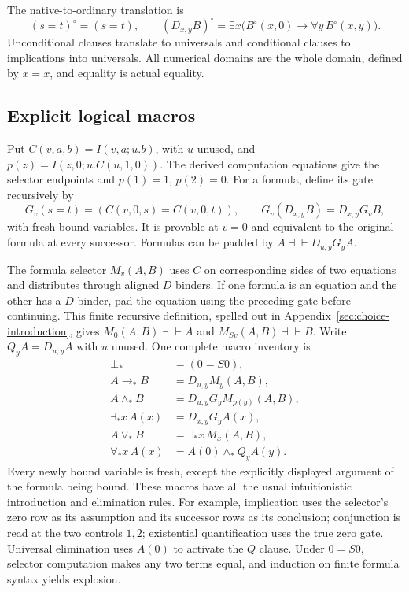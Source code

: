 The native-to-ordinary translation is
\[
 (s=t)^\circ=(s=t),\qquad
 (D_{x,y}B)^\circ=\exists x\bigl(B^\circ(x,0)\to\forall y\,B^\circ(x,y)\bigr).
\]
Unconditional clauses translate to universals and conditional clauses to
implications into universals. All numerical domains are the whole domain,
defined by $x=x$, and equality is actual equality.

\subsection{Explicit logical macros}

Put $C(v,a,b)=I(v,a;u.b)$, with $u$ unused, and
$p(z)=I(z,0;u.C(u,1,0))$. The derived computation equations give the
selector endpoints and $p(1)=1$, $p(2)=0$.
For a formula, define its gate recursively by
\[
 G_v(s=t)=(C(v,0,s)=C(v,0,t)),\qquad
 G_v(D_{x,y}B)=D_{x,y}G_vB,
\]
with fresh bound variables. It is provable at $v=0$ and equivalent to the
original formula at every successor. Formulas can be padded by
$A\dashv\vdash D_{u,y}G_yA$.

The formula selector $M_v(A,B)$ uses $C$ on corresponding sides of two
equations and distributes through aligned $D$ binders. If one formula
is an equation and the other has a $D$ binder, pad the equation using
the preceding gate before continuing. This finite recursive definition,
spelled out in Appendix~\ref{sec:choice-introduction}, gives
$M_0(A,B)\dashv\vdash A$ and $M_{Sv}(A,B)\dashv\vdash B$.
Write $Q_yA=D_{u,y}A$ with $u$ unused. One complete macro inventory is
\[
\begin{aligned}
 \bot_*&=(0=S0),\\
 A\to_*B&=D_{u,y}M_y(A,B),\\
 A\wedge_*B&=D_{u,y}G_y M_{p(y)}(A,B),\\
 \exists_*x\,A(x)&=D_{x,y}G_yA(x),\\
 A\vee_*B&=\exists_*x\,M_x(A,B),\\
 \forall_*x\,A(x)&=A(0)\wedge_* Q_y A(y).
\end{aligned}
\]
Every newly bound variable is fresh, except the explicitly displayed
argument of the formula being bound. These macros have all the usual
intuitionistic introduction and elimination rules. For example,
implication uses the selector's zero row as its assumption and its
successor rows as its conclusion; conjunction is read at the two controls
$1,2$; existential quantification uses the true zero gate. Universal
elimination uses $A(0)$ to activate the $Q$ clause. Under $0=S0$,
selector computation makes any two terms equal, and induction on finite
formula syntax yields explosion.

